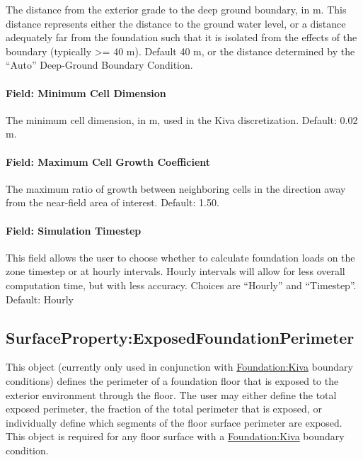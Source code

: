 The distance from the exterior grade to the deep ground boundary, in m.
This distance represents either the distance to the ground water level,
or a distance adequately far from the foundation such that it is
isolated from the effects of the boundary (typically \textgreater{}= 40
m). Default 40 m, or the distance determined by the ``Auto'' Deep-Ground
Boundary Condition.

\paragraph{Field: Minimum Cell Dimension}\label{foundation-kiva-settings-minimum-cell-dimension}

The minimum cell dimension, in m, used in the Kiva discretization.
Default: 0.02 m.

\paragraph{Field: Maximum Cell Growth Coefficient}\label{foundation-kiva-settings-maximum-cell-growth-coefficient}

The maximum ratio of growth between neighboring cells in the direction
away from the near-field area of interest. Default: 1.50.

\paragraph{Field: Simulation Timestep}\label{foundation-kiva-settings-simulation-timestep}

This field allows the user to choose whether to calculate foundation
loads on the zone timestep or at hourly intervals. Hourly intervals will
allow for less overall computation time, but with less accuracy. Choices
are ``Hourly'' and ``Timestep''. Default: Hourly

\subsection{SurfaceProperty:ExposedFoundationPerimeter}\label{surfaceproperty-exposedfoundationperimeter}

This object (currently only used in conjunction with \hyperref[foundationkiva]{Foundation:Kiva}
boundary conditions) defines the perimeter of a foundation floor that is
exposed to the exterior environment through the floor. The user may
either define the total exposed perimeter, the fraction of the total
perimeter that is exposed, or individually define which segments of the
floor surface perimeter are exposed. This object is required for any floor surface with a \hyperref[foundationkiva]{Foundation:Kiva} boundary condition.

